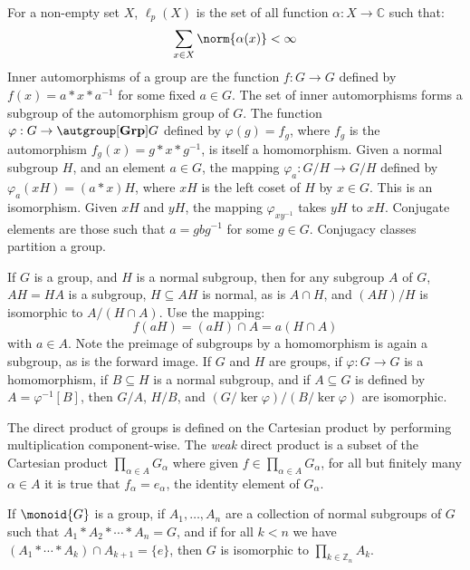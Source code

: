For a non-empty set $X$, $\ell_{p}(X)$ is the set of all function
$\alpha:X\rightarrow\mathbb{C}$ such that:
\begin{equation}
    \sum_{x\in{X}}\norm{\alpha(x)}<\infty
\end{equation}
Inner automorphisms of a group are the function $f:G\rightarrow{G}$ defined by
$f(x)=a*x*a^{\minus{1}}$ for some fixed $a\in{G}$. The set of inner
automorphisms forms a subgroup of the automorphism group of $G$. The function
$\varphi:G\rightarrow\autgroup[\textbf{Grp}]{G}$ defined by
$\varphi(g)=f_{g}$, where $f_{g}$ is the automorphism
$f_{g}(x)=g*x*g^{\minus{1}}$, is itself a homomorphism. Given a normal subgroup
$H$, and an element $a\in{G}$, the mapping
$\varphi_{a}:G/H\rightarrow{G}/H$ defined by
$\varphi_{a}(xH)=(a*x)H$, where $xH$ is the left coset of $H$ by $x\in{G}$. This
is an isomorphism. Given $xH$ and $yH$, the mapping
$\varphi_{xy^{\minus{1}}}$ takes $yH$ to $xH$. Conjugate elements are those
such that $a=gbg^{\minus{1}}$ for some $g\in{G}$. Conjugacy classes partition a
group.
\par\hfill\par
If $G$ is a group, and $H$ is a normal subgroup, then for any subgroup $A$ of
$G$, $AH=HA$ is a subgroup, $H\subseteq{AH}$ is normal, as is $A\cap{H}$, and
$(AH)/H$ is isomorphic to $A/(H\cap{A})$. Use the mapping:
\begin{equation}
    f(aH)=(aH)\cap{A}=a(H\cap{A})
\end{equation}
with $a\in{A}$. Note the preimage of subgroups by a homomorphism is again a
subgroup, as is the forward image. If $G$ and $H$ are groups, if
$\varphi:G\rightarrow{G}$ is a homomorphism, if $B\subseteq{H}$ is a normal
subgroup, and if $A\subseteq{G}$ is defined by $A=\varphi^{\minus{1}}[B]$, then
$G/A$, $H/B$, and $(G/\ker{\varphi})/(B/\ker{\varphi})$ are isomorphic.
\par\hfill\par
The direct product of groups is defined on the Cartesian product by performing
multiplication component-wise. The \textit{weak} direct product is a subset of
the Cartesian product $\prod_{\alpha\in{A}}G_{\alpha}$ where given
$f\in\prod_{\alpha\in{A}}G_{\alpha}$, for all but finitely many $\alpha\in{A}$
it is true that $f_{\alpha}=e_{\alpha}$, the identity element of $G_{\alpha}$.
\begin{theorem}
    If $\monoid{G}$ is a group, if $A_{1},\dots,A_{n}$ are a collection of
    normal subgroups of $G$ such that $A_{1}*A_{2}*\cdots*A_{n}=G$, and if for
    all $k<n$ we have $(A_{1}*\cdots*A_{k})\cap{A}_{k+1}=\{e\}$, then $G$ is
    isomorphic to $\prod_{k\in\mathbb{Z}_{n}}A_{k}$.
\end{theorem}
